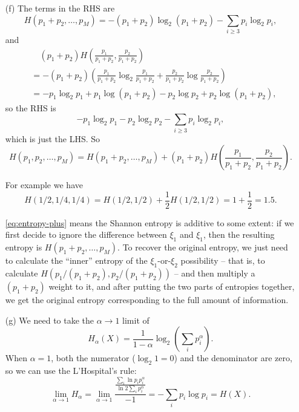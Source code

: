 \documentclass[hyperref, a4paper]{article}
\begin{document}
\begin{itemize}
\item[(f)] The terms in the RHS are
\[
    H(p_1 + p_2, \ldots, p_M) = - (p_1 + p_2) \log_2 (p_1 + p_2) - \sum_{i \geq 3} p_i \log_2 p_i,
\]
and 
\[
    \begin{aligned}
        &\quad (p_1 + p_2) H\left( \frac{p_1}{p_1 + p_2}, \frac{p_2}{p_1 + p_2} \right) \\
        &= - (p_1 + p_2) \left( \frac{p_1}{p_1 + p_2} \log_2 \frac{p_1}{p_1 + p_2}  
        + \frac{p_2}{p_1 + p_2} \log \frac{p_2}{p_1 + p_2} \right) \\
        &= - p_1 \log_2 p_1 + p_1 \log (p_1 + p_2) - p_2 \log p_2 + p_2 \log (p_1 + p_2),
    \end{aligned}
\]
so the RHS is 
\[
    - p_1 \log_2 p_1 - p_2 \log_2 p_2 - \sum_{i \geq 3} p_i \log_2 p_i,
\]
which is just the LHS. So 
\begin{equation}
    H(p_1, p_2, \ldots, p_M) = H(p_1 + p_2, \ldots, p_M) + (p_1 + p_2) H\left( \frac{p_1}{p_1 + p_2}, \frac{p_2}{p_1 + p_2} \right).
    \label{eq:entropy-plus}
\end{equation}

For example we have 
\begin{equation}
    H(1/2, 1/4, 1/4) = H(1/2, 1/2) + \frac{1}{2} H(1/2, 1/2) = 1 + \frac{1}{2} = 1.5.
\end{equation}

\eqref{eq:entropy-plus} means the Shannon entropy is additive to some extent:
if we first decide to ignore the difference between $\xi_1$ and $\xi_1$,
then the resulting entropy is $H(p_1 + p_2, \ldots, p_M)$.
To recover the original entropy,
we just need to calculate the ``inner'' entropy of the $\xi_1$-or-$\xi_2$ possibility -- 
that is, to calculate $H(p_1 / (p_1 + p_2), p_2 / (p_1 + p_2))$ --
and then multiply a $(p_1 + p_2)$ weight to it,
and after putting the two parts of entropies together, 
we get the original entropy corresponding to the full amount of information.

\item[(g)] We need to take the $\alpha \to 1$ limit of 
\begin{equation}
    H_\alpha(X) = \frac{1}{1 - \alpha} \log_2 \left( \sum_i p_i^\alpha \right) .
\end{equation}
When $\alpha = 1$, both the numerator ($\log_2 1 = 0$) and the denominator are zero,
so we can use the L'Hospital's rule:
\[
    \lim_{\alpha \to 1} H_{\alpha} = \lim_{\alpha \to 1} \frac{\frac{\sum_{i} \ln p_i p_i^\alpha}{\ln 2 \sum_{i} p_i^\alpha}}{-1}
    = - \sum_i p_i \log p_i = H(X).
\]


\end{itemize}
\end{document}
